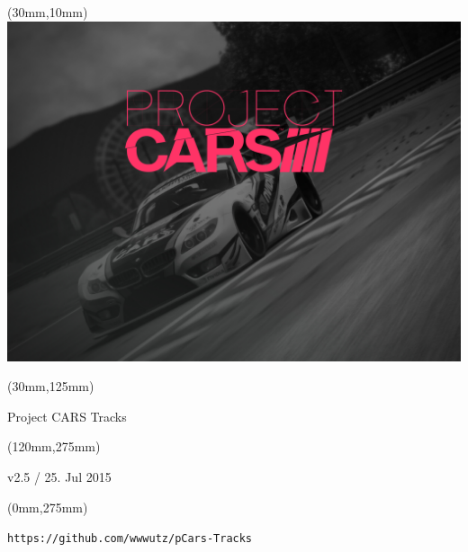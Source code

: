 \documentclass[oneside, a4paper, 12pt]{book}
\begin{document}
\selectfont
\textblockorigin{0cm}{0cm}

\newlength{\Logo}
\setlength{\Logo}{210mm-60mm}
\begin{textblock*}{\Logo}(30mm,10mm)%
\includegraphics[width=\Logo]{pcars-main.png}
\end{textblock*}

\begin{textblock*}{\Logo}(30mm,125mm)%
\begin{center}\Huge{Project CARS Tracks}\end{center}
\end{textblock*}

\begin{textblock*}{90mm}(120mm,275mm)%
\begin{center}\Huge{v2.5 / 25. Jul 2015}\end{center}
\end{textblock*}

\begin{textblock*}{90mm}(0mm,275mm)%
\begin{center}\tt{https://github.com/wwwutz/pCars-Tracks}\end{center}
\end{textblock*}


\null\newpage


\end{document}
